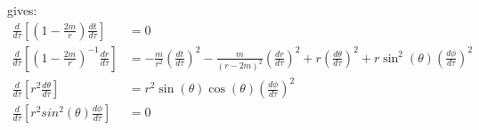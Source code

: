 \documentclass[a4paper]{article}
\begin{document}
gives:
\begin{align*}
	\frac{d}{d\tau} \left[ \left(1-\frac{2m}{r}\right) \frac{dt}{d\tau} \right] &= 0\\
	\frac{d}{d\tau} \left[ \left( 1- \frac{2m}{r}\right)^{-1} \frac{dr}{d\tau} \right] &=  -\frac{m}{r^2} \left(\frac{dt}{d\tau} \right)^2 - \frac{m}{(r-2m)^2}  \left(\frac{dr}{d\tau} \right)^2 + r  \left(\frac{d\theta}{d\tau} \right)^2  + r\sin^2(\theta)  \left(\frac{d\phi}{d\tau} \right)^2\\
	\frac{d}{d\tau} \left[ r^2 \frac{d\theta}{d\tau}  \right]  &= r^2 \sin(\theta)\cos(\theta) \left( \frac{d\phi}{d\tau} \right)^2 \\
	\frac{d}{d\tau} \left[r^2 sin^2(\theta) \frac{d\phi}{d\tau} \right] &= 0
\end{align*}
\end{document}
